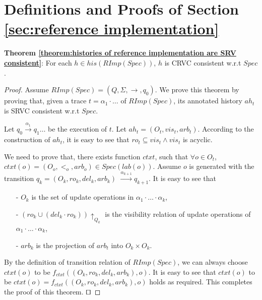 
\section{Definitions and Proofs of Section \ref{sec:reference implementation}}
\label{sec:appendix definitions and proofs of section reference implementation}

{\noindent \bf Theorem \ref{theorem:histories of reference implementation are SRV consistent}}: For each $h \in \mathit{his}(\mathit{RImp}(\mathit{Spec}))$, $h$ is CRVC consistent w.r.t $\mathit{Spec}$.

\begin {proof}

Assume $\mathit{RImp}(\mathit{Spec}) = (Q,\Sigma,\rightarrow,q_0)$. We prove this theorem by proving that, given a trace $t = \alpha_1 \cdot \ldots$ of $\mathit{RImp}(\mathit{Spec})$, its annotated history $\mathit{ah}_t$ is SRVC consistent w.r.t $\mathit{Spec}$.

Let $q_0 {\xrightarrow{\alpha_1}} q_1 \ldots$ be the execution of $t$. Let $\mathit{ah}_t = (O_t,\mathit{vis}_t,\mathit{arb}_t)$. According to the construction of $\mathit{ah}_t$, it is easy to see that $\mathit{ro}_t \subseteq \mathit{vis}_t \wedge \mathit{vis}_t$ is acyclic.

We need to prove that, there exists function $ctxt$, such that $\forall o \in O_t$, $ctxt(o) = (O_o,<_o,arb_o) \in Spec(lab(o))$. Assume $o$ is generated with the transition $q_k = (O_k,\mathit{ro}_k,\mathit{del}_k,\mathit{arb}_k)$ ${\xrightarrow{\alpha_{k+1}}} q_{k+1}$. It is easy to see that

\begin{itemize}
\setlength{\itemsep}{0.5pt}
\item[-] $O_k$ is the set of update operations in $\alpha_1 \cdot \ldots \cdot \alpha_k$,

\item[-] $(\mathit{ro}_k \cup (\mathit{del}_k \cdot \mathit{ro}_k)) \uparrow_{ Q_k }$ is the visibility relation of update operations of $\alpha_1 \cdot \ldots \cdot \alpha_k$,

\item[-] $\mathit{arb}_k$ is the projection of $arb_t$ into $O_k \times O_k$.
\end{itemize}

By the definition of transition relation of $\mathit{RImp}(\mathit{Spec})$, we can always choose $ctxt(o)$ to be $f_{\mathit{ctxt}}((O_k,\mathit{ro}_k,\mathit{del}_k,\mathit{arb}_k),o)$. It is easy to see that $ctxt(o)$ to be $ctxt(o) = f_{\mathit{ctxt}}((O_k,\mathit{ro}_k,\mathit{del}_k,\mathit{arb}_k),o)$ holds as required. This completes the proof of this theorem. $\qed$
\end {proof}





